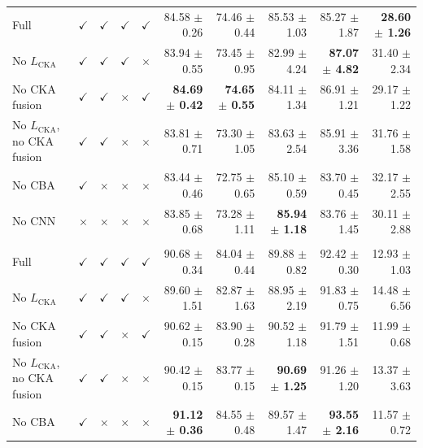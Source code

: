 \documentclass[10pt]{article}
\begin{document}
{\begin{longtable}{lcccc rrrrr}
\addlinespace[4pt]
\multicolumn{10}{l}{\textit{Source: OTU $\rightarrow$ Target: USOVA}} \\
\midrule
Full & $\checkmark$ & $\checkmark$ & $\checkmark$ & $\checkmark$ & 84.58 $\pm$ 0.26 & 74.46 $\pm$ 0.44 & 85.53 $\pm$ 1.03 & 85.27 $\pm$ 1.87 & \textbf{28.60 $\pm$ 1.26} \\
No $L_{\mathrm{CKA}}$ & $\checkmark$ & $\checkmark$ & $\checkmark$ & $\times$ & 83.94 $\pm$ 0.55 & 73.45 $\pm$ 0.95 & 82.99 $\pm$ 4.24 & \textbf{87.07 $\pm$ 4.82} & 31.40 $\pm$ 2.34 \\
No CKA fusion & $\checkmark$ & $\checkmark$ & $\times$ & $\checkmark$ & \textbf{84.69 $\pm$ 0.42} & \textbf{74.65 $\pm$ 0.55} & 84.11 $\pm$ 1.34 & 86.91 $\pm$ 1.21 & 29.17 $\pm$ 1.22 \\
No $L_{\mathrm{CKA}}$, no CKA fusion & $\checkmark$ & $\checkmark$ & $\times$ & $\times$ & 83.81 $\pm$ 0.71 & 73.30 $\pm$ 1.05 & 83.63 $\pm$ 2.54 & 85.91 $\pm$ 3.36 & 31.76 $\pm$ 1.58 \\
No CBA & $\checkmark$ & $\times$ & $\times$ & $\times$ & 83.44 $\pm$ 0.46 & 72.75 $\pm$ 0.65 & 85.10 $\pm$ 0.59 & 83.70 $\pm$ 0.45 & 32.17 $\pm$ 2.55 \\
No CNN & $\times$ & $\times$ & $\times$ & $\times$ & 83.85 $\pm$ 0.68 & 73.28 $\pm$ 1.11 & \textbf{85.94 $\pm$ 1.18} & 83.76 $\pm$ 1.45 & 30.11 $\pm$ 2.88 \\
\addlinespace[4pt]
\multicolumn{10}{l}{\textit{Source: OVATUS $\rightarrow$ Target: OTU}} \\
\midrule
Full & $\checkmark$ & $\checkmark$ & $\checkmark$ & $\checkmark$ & 90.68 $\pm$ 0.34 & 84.04 $\pm$ 0.44 & 89.88 $\pm$ 0.82 & 92.42 $\pm$ 0.30 & 12.93 $\pm$ 1.03 \\
No $L_{\mathrm{CKA}}$ & $\checkmark$ & $\checkmark$ & $\checkmark$ & $\times$ & 89.60 $\pm$ 1.51 & 82.87 $\pm$ 1.63 & 88.95 $\pm$ 2.19 & 91.83 $\pm$ 0.75 & 14.48 $\pm$ 6.56 \\
No CKA fusion & $\checkmark$ & $\checkmark$ & $\times$ & $\checkmark$ & 90.62 $\pm$ 0.15 & 83.90 $\pm$ 0.28 & 90.52 $\pm$ 1.18 & 91.79 $\pm$ 1.51 & 11.99 $\pm$ 0.68 \\
No $L_{\mathrm{CKA}}$, no CKA fusion & $\checkmark$ & $\checkmark$ & $\times$ & $\times$ & 90.42 $\pm$ 0.15 & 83.77 $\pm$ 0.15 & \textbf{90.69 $\pm$ 1.25} & 91.26 $\pm$ 1.20 & 13.37 $\pm$ 3.63 \\
No CBA & $\checkmark$ & $\times$ & $\times$ & $\times$ & \textbf{91.12 $\pm$ 0.36} & 84.55 $\pm$ 0.48 & 89.57 $\pm$ 1.47 & \textbf{93.55 $\pm$ 2.16} & 11.57 $\pm$ 0.72 \\

\end{longtable}}
\end{document}
